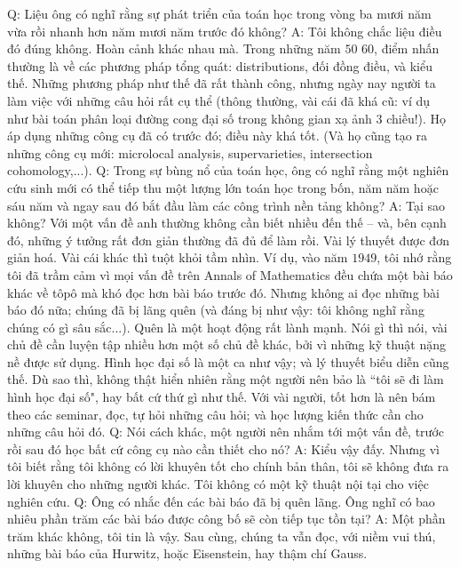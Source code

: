 \begin{multicols}{2}
	\vskip 0.1cm
	Q: Liệu ông có nghĩ rằng sự phát triển của toán học trong vòng ba mươi năm vừa rồi nhanh hơn năm mươi năm trước đó không?
	\vskip 0.1cm
	A: Tôi không chắc liệu điều đó đúng không. Hoàn cảnh khác nhau mà. Trong những năm $50$ $60$, điểm nhấn thường là về các phương pháp tổng quát: distributions, đối đồng điều, và kiểu thế. Những phương pháp như thế đã rất thành công, nhưng ngày nay người ta làm việc với những câu hỏi rất cụ thể (thông thường, vài cái đã khá cũ: ví dụ như bài toán phân loại đường cong đại số trong không gian xạ ảnh $3$ chiều!). Họ áp dụng những công cụ đã có trước đó; điều này khá tốt. (Và họ cũng tạo ra những công cụ mới: microlocal analysis, supervarieties, intersection cohomology,...). 
	\vskip 0.1cm
	Q: Trong sự bùng nổ của toán học, ông có nghĩ rằng một nghiên cứu sinh mới có thể tiếp thu một lượng lớn toán học trong bốn, năm năm hoặc sáu năm và ngay sau đó bắt đầu làm các công trình nền tảng không?
	\vskip 0.1cm
	A: Tại sao không? Với một vấn đề anh thường không cần biết nhiều đến thế -- và, bên cạnh đó, những ý tưởng rất đơn giản thường đã đủ để làm rồi. 
	\vskip 0.1cm
	Vài lý thuyết được đơn giản hoá. Vài cái khác thì tuột khỏi tầm nhìn. Ví dụ, vào năm $1949$, tôi nhớ rằng tôi đã trầm cảm vì mọi vấn đề trên Annals of Mathematics đều chứa một bài báo khác về tôpô mà khó đọc hơn bài báo trước đó. Nhưng không ai đọc những bài báo đó nữa; chúng đã bị lãng quên (và đáng bị như vậy: tôi không nghĩ rằng chúng có gì sâu sắc...). Quên là một hoạt động rất lành mạnh.
	\vskip 0.1cm
	Nói gì thì nói, vài chủ đề cần luyện tập nhiều hơn một số chủ đề khác, bởi vì những kỹ thuật nặng nề được sử dụng. Hình học đại số là một ca như vậy; và lý thuyết biểu diễn cũng thế.
	\vskip 0.1cm
	Dù sao thì, không thật hiển nhiên rằng một người nên bảo là ``tôi sẽ đi làm hình học đại số", hay bất cứ thứ gì như thế. Với vài người, tốt hơn là nên bám theo các seminar, đọc, tự hỏi những câu hỏi; và học lượng kiến thức cần cho những câu hỏi đó. 
	\vskip 0.1cm
	Q: Nói cách khác, một người nên nhắm tới một vấn đề, trước rồi sau đó học bất cứ công cụ nào cần thiết cho nó?
	\vskip 0.1cm
	A: Kiểu vậy đấy. Nhưng vì tôi biết rằng tôi không có lời khuyên tốt cho chính bản thân, tôi sẽ không đưa ra lời khuyên cho những người khác. Tôi không có một kỹ thuật nội tại cho việc nghiên cứu.
	\vskip 0.1cm
	Q: Ông có nhắc đến các bài báo đã bị quên lãng. Ông nghĩ có bao nhiêu phần trăm các bài báo được công bố sẽ còn tiếp tục tồn tại?
	\vskip 0.1cm
	A: Một phần trăm khác không, tôi tin là vậy. Sau cùng, chúng ta vẫn đọc, với niềm vui thú, những bài báo của Hurwitz, hoặc Eisenstein, hay thậm chí Gauss.

\end{multicols}
